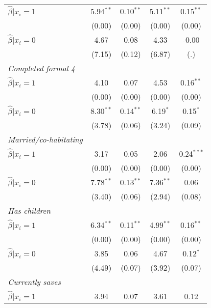 \begin{table}[htbp]
{\begin{threeparttable}
\begin{tabular}{l*{4}{c}}
\hspace{0.5cm} \(\hat\beta|x_i=1\)&5.94$^{**}$&0.10$^{**}$&5.11$^{**}$&0.15$^{**}$\\
                &   (0.00)&   (0.00)&   (0.00)&   (0.00)\\
\hspace{0.5cm} \(\hat\beta|x_i=0\)&     4.67&     0.08&     4.33&    -0.00\\
                &   (7.15)&   (0.12)&   (6.87)&      (.)\\
\textit{Completed formal 4}&         &         &         &         \\
\hspace{0.5cm} \(\hat\beta|x_i=1\)&     4.10&     0.07&     4.53&0.16$^{**}$\\
                &   (0.00)&   (0.00)&   (0.00)&   (0.00)\\
\hspace{0.5cm} \(\hat\beta|x_i=0\)&8.30$^{**}$&0.14$^{**}$&6.19$^{*}$&0.15$^{*}$\\
                &   (3.78)&   (0.06)&   (3.24)&   (0.09)\\
\textit{Married/co-habitating}&         &         &         &         \\
\hspace{0.5cm} \(\hat\beta|x_i=1\)&     3.17&     0.05&     2.06&0.24$^{***}$\\
                &   (0.00)&   (0.00)&   (0.00)&   (0.00)\\
\hspace{0.5cm} \(\hat\beta|x_i=0\)&7.78$^{**}$&0.13$^{**}$&7.36$^{**}$&     0.06\\
                &   (3.40)&   (0.06)&   (2.94)&   (0.08)\\
\textit{Has children}&         &         &         &         \\
\hspace{0.5cm} \(\hat\beta|x_i=1\)&6.34$^{**}$&0.11$^{**}$&4.99$^{**}$&0.16$^{**}$\\
                &   (0.00)&   (0.00)&   (0.00)&   (0.00)\\
\hspace{0.5cm} \(\hat\beta|x_i=0\)&     3.85&     0.06&     4.67&0.12$^{*}$\\
                &   (4.49)&   (0.07)&   (3.92)&   (0.07)\\
\textit{Currently saves}&         &         &         &         \\
\hspace{0.5cm} \(\hat\beta|x_i=1\)&     3.94&     0.07&     3.61&     0.12\\

\end{tabular}
\end{threeparttable}}
\end{table}
